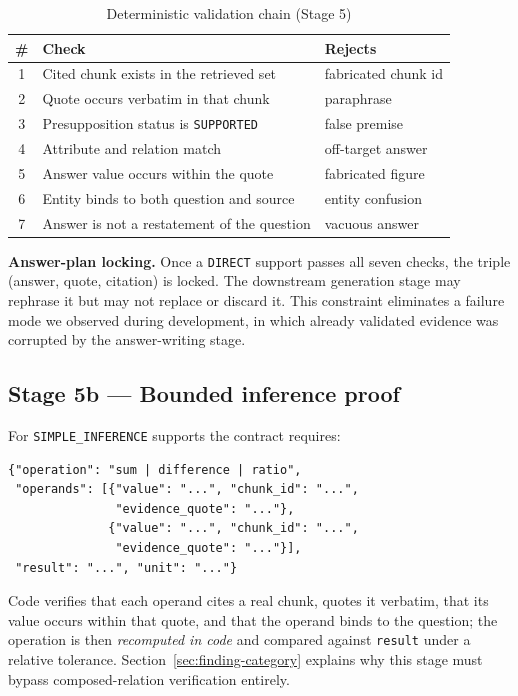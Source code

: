\documentclass[conference]{IEEEtran}
\begin{document}
\begin{table}[t]
\caption{Deterministic validation chain (Stage 5)}
\label{tab:checks}
\centering
\footnotesize
\begin{tabular}{@{}clp{2.9cm}@{}}
\toprule
\# & Check & Rejects \\
\midrule
1 & Cited chunk exists in the retrieved set & fabricated chunk id \\
2 & Quote occurs verbatim in that chunk & paraphrase \\
3 & Presupposition status is \texttt{SUPPORTED} & false premise \\
4 & Attribute and relation match & off-target answer \\
5 & Answer value occurs within the quote & fabricated figure \\
6 & Entity binds to both question and source & entity confusion \\
7 & Answer is not a restatement of the question & vacuous answer \\
\bottomrule
\end{tabular}
\end{table}

\textbf{Answer-plan locking.} Once a \texttt{DIRECT} support passes all seven
checks, the triple (answer, quote, citation) is locked. The downstream generation
stage may rephrase it but may not replace or discard it. This constraint
eliminates a failure mode we observed during development, in which already
validated evidence was corrupted by the answer-writing stage.

\subsection{Stage 5b --- Bounded inference proof}
\label{sec:proof}

For \texttt{SIMPLE\_INFERENCE} supports the contract requires:

\begin{lstlisting}[style=contract]
{"operation": "sum | difference | ratio",
 "operands": [{"value": "...", "chunk_id": "...",
               "evidence_quote": "..."},
              {"value": "...", "chunk_id": "...",
               "evidence_quote": "..."}],
 "result": "...", "unit": "..."}
\end{lstlisting}

Code verifies that each operand cites a real chunk, quotes it verbatim, that its
value occurs within that quote, and that the operand binds to the question; the
operation is then \emph{recomputed in code} and compared against \texttt{result}
under a relative tolerance. Section~\ref{sec:finding-category} explains why this
stage must bypass composed-relation verification entirely.
\end{document}
